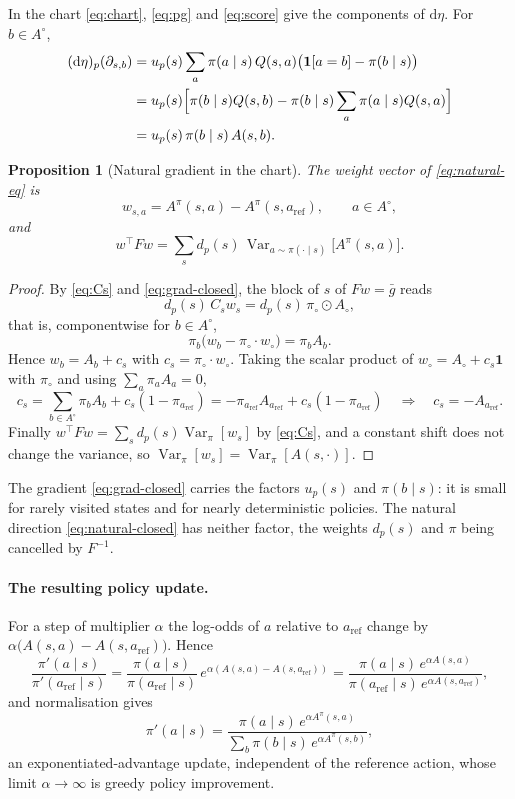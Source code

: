 \documentclass[11pt,a4paper]{article}
\numberwithin{equation}{section}
\theoremstyle{plain}
\newtheorem{proposition}[theorem]{Proposition}
\theoremstyle{definition}
\theoremstyle{remark}
\newcommand{\T}{^{\top}}
\newcommand{\dd}{\mathrm{d}}
\DeclareMathOperator{\Var}{Var}
\newcommand{\aref}{a_{\mathrm{ref}}}
\newcommand{\Ao}{A^{\circ}}
\newcommand{\pio}{\pi_{\circ}}
\newcommand{\Ind}{\mathbf{1}}
\begin{document}
In the chart \eqref{eq:chart}, \eqref{eq:pg} and \eqref{eq:score} give the components of $\dd\eta$. For $b\in\Ao$,
\begin{align}
  (\dd\eta)_p(\partial_{s,b})
  &=u_p(s)\sum_a\pi(a\mid s)\,Q(s,a)\bigl(\Ind[a=b]-\pi(b\mid s)\bigr)\nonumber\\
  &=u_p(s)\Bigl[\pi(b\mid s)Q(s,b)-\pi(b\mid s)\sum_a\pi(a\mid s)Q(s,a)\Bigr]\nonumber\\
  &=u_p(s)\,\pi(b\mid s)\,A(s,b).\label{eq:grad-closed}
\end{align}

\begin{proposition}[Natural gradient in the chart]\label{prop:natural-closed}
The weight vector of \eqref{eq:natural-eq} is
\begin{equation}\label{eq:natural-closed}
  w_{s,a}=A^\pi(s,a)-A^\pi(s,\aref),\qquad a\in\Ao,
\end{equation}
and
\[
  w\T Fw=\sum_sd_p(s)\,\Var_{a\sim\pi(\cdot\mid s)}\bigl[A^\pi(s,a)\bigr].
\]
\end{proposition}

\begin{proof}
By \eqref{eq:Cs} and \eqref{eq:grad-closed}, the block of $s$ of $Fw=\bar g$ reads
\[
  d_p(s)\,C_sw_s=d_p(s)\,\pio\odot A_\circ,
\]
that is, componentwise for $b\in\Ao$,
\[
  \pi_b\bigl(w_b-\pio\cdot w_\circ\bigr)=\pi_bA_b .
\]
Hence $w_b=A_b+c_s$ with $c_s=\pio\cdot w_\circ$. Taking the scalar product of $w_\circ=A_\circ+c_s\mathbf 1$ with $\pio$ and using $\sum_a\pi_aA_a=0$,
\[
  c_s=\sum_{b\in\Ao}\pi_bA_b+c_s(1-\pi_{\aref})=-\pi_{\aref}A_{\aref}+c_s(1-\pi_{\aref})
  \quad\Longrightarrow\quad c_s=-A_{\aref}.
\]
Finally $w\T Fw=\sum_sd_p(s)\Var_\pi[w_s]$ by \eqref{eq:Cs}, and a constant shift does not change the variance, so $\Var_\pi[w_s]=\Var_\pi[A(s,\cdot)]$.
\end{proof}

The gradient \eqref{eq:grad-closed} carries the factors $u_p(s)$ and $\pi(b\mid s)$: it is small for rarely visited states and for nearly deterministic policies. The natural direction
\eqref{eq:natural-closed} has neither factor, the weights $d_p(s)$ and $\pi$ being cancelled by $F^{-1}$.

\paragraph{The resulting policy update.}
For a step of multiplier $\alpha$ the log-odds of $a$ relative to $\aref$ change by $\alpha\bigl(A(s,a)-A(s,\aref)\bigr)$. Hence
\[
  \frac{\pi'(a\mid s)}{\pi'(\aref\mid s)}=\frac{\pi(a\mid s)}{\pi(\aref\mid s)}\,e^{\alpha(A(s,a)-A(s,\aref))}
  =\frac{\pi(a\mid s)\,e^{\alpha A(s,a)}}{\pi(\aref\mid s)\,e^{\alpha A(s,\aref)}},
\]
and normalisation gives
\begin{equation}\label{eq:exp-update}
  \pi'(a\mid s)=\frac{\pi(a\mid s)\,e^{\alpha A^\pi(s,a)}}{\sum_b\pi(b\mid s)\,e^{\alpha A^\pi(s,b)}},
\end{equation}
an exponentiated-advantage update, independent of the reference action, whose limit $\alpha\to\infty$ is greedy policy improvement.
\end{document}
